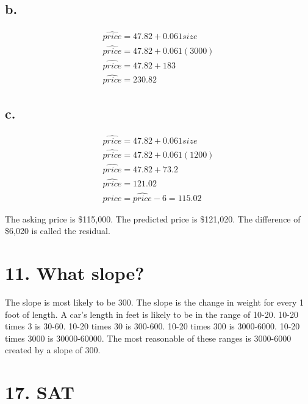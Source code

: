\documentclass{article}
\begin{document}
\subsection*{b.}
\begin{gather}
    \widehat{price}=47.82+0.061size \\
    \widehat{price}=47.82+0.061(3000) \\
    \widehat{price}=47.82+183 \\
    \widehat{price}=230.82
\end{gather}

\subsection*{c.}
\begin{table}[H]
    \begin{minipage}{.6\textwidth}
        \begin{gather}
            \widehat{price}=47.82+0.061size \\
            \widehat{price}=47.82+0.061(1200) \\
            \widehat{price}=47.82+73.2 \\
            \widehat{price}=121.02 \\
            price = \widehat{price} - 6 = 115.02
        \end{gather}
    \end{minipage}
    \quad
    \begin{minipage}{.3\textwidth}
        The asking price is \$115,000. The predicted price is \$121,020. The
        difference of \$6,020 is called the residual.
    \end{minipage}
\end{table}

\section*{11. What slope?}
The slope is most likely to be 300. The slope is the change in weight for every
1 foot of length. A car's length in feet is likely to be in the range of 10-20.
10-20 times 3 is 30-60. 10-20 times 30 is 300-600. 10-20 times 300 is
3000-6000. 10-20 times 3000 is 30000-60000. The most reasonable of these ranges
is 3000-6000 created by a slope of 300.

\section*{17. SAT}
\end{document}
